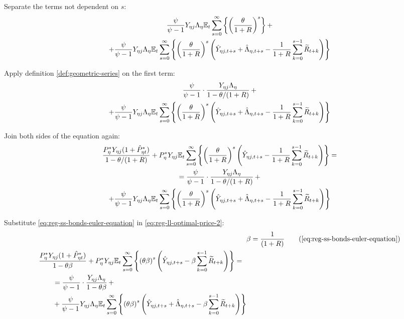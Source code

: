 \documentclass[../thesis.tex]{subfiles}
\begin{document}
Separate the terms not dependent on $s$:
\begin{multline}
	\frac{\psi}{\psi-1} Y_{\eta j} \Lambda_{\eta} {\mathbb{E}_{t}} \sum_{s=0}^{\infty} \left\{ \left( \frac{\theta}{1 + R} \right)^s \right\} + 
	\\
	+ \frac{\psi}{\psi-1} Y_{\eta j} \Lambda_{\eta} {\mathbb{E}_{t}} \sum_{s=0}^{\infty} \left\{ \left( \frac{\theta}{1 + R} \right)^s \left( \hat{Y}_{\eta j, t+s} + \hat{\Lambda}_{\eta, t+s} - \frac{1}{1 + R} \sum_{k=0}^{s-1} \widetilde{R}_{t+k} \right) \right\} \nonumber
\end{multline}

Apply definition \ref{def:geometric-series} on the first term:
\begin{multline}
	\frac{\psi}{\psi-1} \cdot \frac{Y_{\eta j} \Lambda_{\eta}}{1-\theta /(1+R)} \, + 
	\\
	+ \frac{\psi}{\psi-1} Y_{\eta j} \Lambda_{\eta} {\mathbb{E}_{t}} \sum_{s=0}^{\infty} \left\{ \left( \frac{\theta}{1 + R} \right)^s \left( \hat{Y}_{\eta j, t+s} + \hat{\Lambda}_{\eta, t+s} - \frac{1}{1 + R} \sum_{k=0}^{s-1} \widetilde{R}_{t+k} \right) \right\} \nonumber
\end{multline}

Join both sides of the equation again:
\begin{multline}
	\frac{ P_{\eta}^{\ast} Y_{\eta j} ( 1 + \hat{P}_{\eta t}^{\ast} )}{1-\theta /(1+R)} + P_{\eta}^{\ast} Y_{\eta j} {\mathbb{E}_{t}} \sum_{s=0}^{\infty} \left\{ \left( \frac{\theta}{1 + R} \right)^s \left( \hat{Y}_{\eta j, t+s} - \frac{1}{1 + R} \sum_{k=0}^{s-1} \widetilde{R}_{t+k} \right) \right\} = 
	\\
	= \frac{\psi}{\psi-1} \cdot \frac{Y_{\eta j} \Lambda_{\eta}}{1-\theta /(1+R)} \, + 
	\\
	+ \frac{\psi}{\psi-1} Y_{\eta j} \Lambda_{\eta} {\mathbb{E}_{t}} \sum_{s=0}^{\infty} \left\{ \left( \frac{\theta}{1 + R} \right)^s \left( \hat{Y}_{\eta j, t+s} + \hat{\Lambda}_{\eta, t+s} - \frac{1}{1 + R} \sum_{k=0}^{s-1} \widetilde{R}_{t+k} \right) \right\} \label{eq:reg-ll-optimal-price-2}
\end{multline}

Substitute \ref{eq:reg-ss-bonds-euler-equation} in \ref{eq:reg-ll-optimal-price-2}:
\begin{align}
	& \beta = \frac{1}{(1 + R)} \tag{\ref{eq:reg-ss-bonds-euler-equation}} \\
	\begin{split} & \frac{ P_{\eta}^{\ast} Y_{\eta j} ( 1 + \hat{P}_{\eta t}^{\ast} )}{1- \theta \beta} + P_{\eta}^{\ast} Y_{\eta j} \E \sum_{s=0}^{\infty} \left\{ \left( \theta \beta \right)^s \left( \hat{Y}_{\eta j, t+s} - \beta \sum_{k=0}^{s-1} \widetilde{R}_{t+k} \right) \right\} = \\ & \qquad = \frac{\psi}{\psi-1} \cdot \frac{Y_{\eta j} \Lambda_{\eta}}{1- \theta \beta} \, + \\ & \qquad + \frac{\psi}{\psi-1} Y_{\eta j} \Lambda_{\eta} \E \sum_{s=0}^{\infty} \left\{ \left( \theta \beta \right)^s \left( \hat{Y}_{\eta j, t+s} + \hat{\Lambda}_{\eta, t+s} - \beta \sum_{k=0}^{s-1} \widetilde{R}_{t+k} \right) \right\} \end{split} \label{eq:reg-ll-optimal-price-3}
\end{align}
\end{document}
